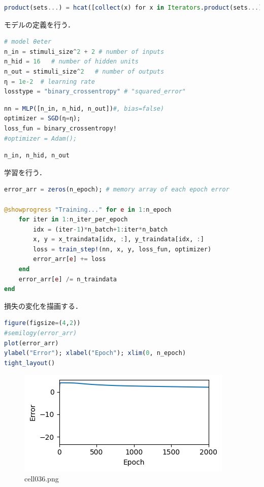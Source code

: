 \begin{lstlisting}[language=julia]
product(sets...) = hcat([collect(x) for x in Iterators.product(sets...)]...)' # Array of Cartesian product of sets 
\end{lstlisting}
モデルの定義を行う．
\begin{lstlisting}[language=julia]
# model θeter
n_in = stimuli_size^2 + 2 # number of inputs
n_hid = 16   # number of hidden units
n_out = stimuli_size^2   # number of outputs
η = 1e-2  # learning rate
losstype = "binary_crossentropy" # "squared_error"
\end{lstlisting}
\begin{lstlisting}[language=julia]
nn = MLP([n_in, n_hid, n_out])#, bias=false)
optimizer = SGD(η=η);
loss_fun = binary_crossentropy!
#optimizer = Adam();
\end{lstlisting}
\begin{lstlisting}[language=julia]
n_in, n_hid, n_out
\end{lstlisting}
学習を行う．
\begin{lstlisting}[language=julia]
error_arr = zeros(n_epoch); # memory array of each epoch error

@showprogress "Training..." for e in 1:n_epoch
    for iter in 1:n_iter_per_epoch
        idx = (iter-1)*n_batch+1:iter*n_batch
        x, y = x_traindata[idx, :], y_traindata[idx, :]
        loss = train_step!(nn, x, y, loss_fun, optimizer)
        error_arr[e] += loss
    end 
    error_arr[e] /= n_traindata
end
\end{lstlisting}
損失の変化を描画する．
\begin{lstlisting}[language=julia]
figure(figsize=(4,2))
#semilogy(error_arr)
plot(error_arr)
ylabel("Error"); xlabel("Epoch"); xlim(0, n_epoch)
tight_layout()
\end{lstlisting}
\begin{figure}[ht]
	\centering
	\includegraphics[scale=0.8, max width=\linewidth]{./fig/solve-credit-assignment-problem/backpropagation/cell036.png}
	\caption{cell036.png}
	\label{cell036.png}
\end{figure}
